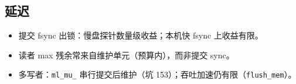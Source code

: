\subsection{延迟}
\begin{itemize}[leftmargin=1.6em]
  \item 提交 fsync 出锁：慢盘探针数量级收益；本机快 fsync 上收益有限。
  \item 读者 max 残余常来自维护单元（预算内），而非提交 sync。
  \item 多写者：\texttt{ml\_mu\_} 串行提交后维护（坑 153）；吞吐加速仍有限（\texttt{flush\_mem}）。
\end{itemize}
